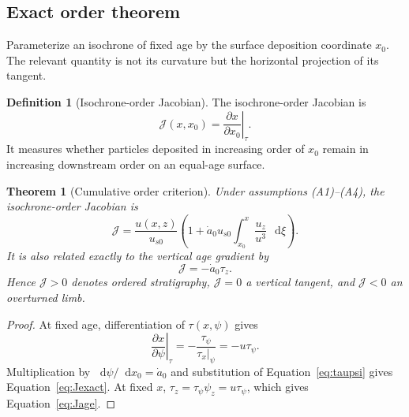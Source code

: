 \documentclass[review]{igs}
\newtheorem{theorem}{Theorem}
\theoremstyle{definition}
\newtheorem{definition}{Definition}
\theoremstyle{remark}
\newcommand{\dd}{\mathop{}\!\mathrm{d}}
\newcommand{\Jord}{\mathcal{J}}
\begin{document}
\subsection{Exact order theorem}

Parameterize an isochrone of fixed age by the surface deposition coordinate \(x_0\). The relevant quantity is not its curvature but the horizontal projection of its tangent.

\begin{definition}[Isochrone-order Jacobian]
The isochrone-order Jacobian is
\begin{equation}
\Jord(x,x_0)
=\left.\frac{\partial x}{\partial x_0}\right|_{\tau}.
\label{eq:Jdefinition}
\end{equation}
It measures whether particles deposited in increasing order of \(x_0\) remain in increasing downstream order on an equal-age surface.
\end{definition}

\begin{theorem}[Cumulative order criterion]
Under assumptions (A1)--(A4), the isochrone-order Jacobian is
\begin{equation}
\boxed{
\Jord
=\frac{u(x,z)}{u_{s0}}
\left(
1+\dot a_0u_{s0}
\int_{x_0}^{x}\frac{u_z}{u^3}\,\dd\xi
\right).
}
\label{eq:Jexact}
\end{equation}
It is also related exactly to the vertical age gradient by
\begin{equation}
\boxed{\Jord=-\dot a_0\tau_z.}
\label{eq:Jage}
\end{equation}
Hence \(\Jord>0\) denotes ordered stratigraphy, \(\Jord=0\) a vertical tangent, and \(\Jord<0\) an overturned limb.
\end{theorem}

\begin{proof}
At fixed age, differentiation of \(\tau(x,\psi)\) gives
\begin{equation}
\left.\frac{\partial x}{\partial\psi}\right|_{\tau}
=-\frac{\tau_{\psi}}{\tau_x|_{\psi}}
=-u\tau_{\psi}.
\end{equation}
Multiplication by \(\dd\psi/\dd x_0=\dot a_0\) and substitution of Equation~\eqref{eq:taupsi} gives Equation~\eqref{eq:Jexact}. At fixed \(x\), \(\tau_z=\tau_{\psi}\psi_z=u\tau_{\psi}\), which gives Equation~\eqref{eq:Jage}.
\end{proof}
\end{document}
